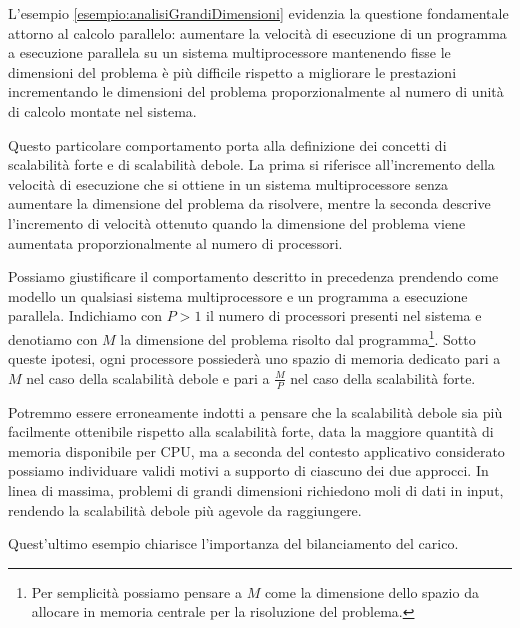 L'esempio \ref{esempio:analisiGrandiDimensioni} evidenzia la questione fondamentale attorno al calcolo parallelo: aumentare la velocit\`a di esecuzione
di un programma a esecuzione parallela su un sistema multiprocessore mantenendo fisse le dimensioni del problema \`e pi\`u difficile rispetto a migliorare
le prestazioni incrementando le dimensioni del problema proporzionalmente al numero di unit\`a di calcolo montate nel sistema.

Questo particolare comportamento porta alla definizione dei concetti di scalabilit\`a forte e di scalabilit\`a debole.\newline
La prima si riferisce all'incremento della velocit\`a di esecuzione che si ottiene in un sistema multiprocessore senza aumentare la dimensione del problema da
risolvere, mentre la seconda descrive l'incremento di velocit\`a ottenuto quando la dimensione del problema viene aumentata proporzionalmente al numero
di processori.

Possiamo giustificare il comportamento descritto in precedenza prendendo come modello un qualsiasi sistema multiprocessore e un programma a esecuzione parallela.\newline
Indichiamo con $P > 1$ il numero di processori presenti nel
sistema e denotiamo con $M$ la dimensione del problema risolto dal programma\footnote{Per semplicit\`a possiamo pensare a $M$ come la dimensione dello spazio da allocare in memoria centrale per la
    risoluzione del problema.}.\newline
Sotto queste ipotesi, ogni processore possieder\`a uno spazio di memoria dedicato pari a $M$ nel caso della scalabilit\`a debole e pari a $\frac{M}{P}$ nel
caso della scalabilit\`a forte.

Potremmo essere erroneamente indotti a pensare che la scalabilit\`a debole sia pi\`u facilmente ottenibile rispetto alla scalabilit\`a forte, data la maggiore quantit\`a di memoria disponibile per CPU, ma a seconda
del contesto applicativo considerato possiamo individuare validi motivi a supporto di ciascuno dei due approcci.\newline
In linea di massima, problemi di grandi
dimensioni richiedono moli di dati in input, rendendo la scalabilit\`a debole pi\`u agevole da raggiungere.

Quest'ultimo esempio chiarisce l'importanza del bilanciamento del carico.

